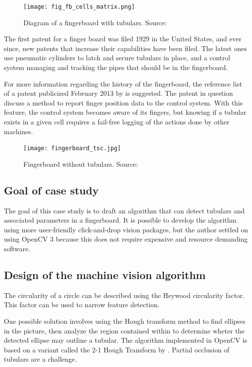 \begin{figure}[ht]
    \centering
    \texttt{[image: fig\_fb\_cells\_matrix.png]}
    \caption{Diagram of a fingerboard with tubulars. Source:\cite{fig_fb_cells_matrix13}}
    \label{fig:fb_cells_matrix}
\end{figure}
\FloatBarrier

The first patent for a finger board was filed 1929 in the United States, and ever since, new patents that increase their capabilities have been filed. The latest ones use pneumatic cylinders to latch and secure tubulars in place, and a control system managing and tracking the pipes that should be in the fingerboard.

For more information regarding the history of the fingerboard, the reference list of a patent publicized February 2013 by \citet{pat_james13} is suggested. The patent in question discuss a method to report finger position data to the control system. With this feature, the control system becomes aware of its fingers, but knowing if a tubular exists in a given cell requires a fail-free logging of the actions done by other machines.

\begin{figure}[ht]
    \centering
    \texttt{[image: fingerboard\_tsc.jpg]}
    \caption{Fingerboard without tubulars. Source:\cite{fig_fb_tsc15}}
    \label{fig:fb_tsc15}
\end{figure}
\FloatBarrier


\subsection{Goal of case study}
The goal of this case study is to draft an algorithm that can detect tubulars and associated parameters in a fingerboard. It is possible to develop the algorithm using more user-friendly click-and-drop vision packages, but the author settled on using OpenCV 3 because this does not require expensive and resource demanding software.

\subsection{Design of the machine vision algorithm}
The circularity of a circle can be described using the Heywood circularity factor. This factor can be used to narrow feature detection.

One possible solution involves using the Hough transform method to find ellipses in the picture, then analyze the region contained within to determine wheter the detected ellipse may outline a tubular. The algorithm implemented in OpenCV is based on a variant called the 2-1 Hough Transform by \citet{yuen90}. Partial occlusion of tubulars are a challenge.

